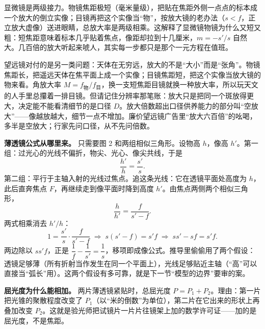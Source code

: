 \begin{mainline}
显微镜是两级接力。物镜焦距极短（毫米量级），把贴在焦距外侧一点点的标本成一个放大的倒立实像；目镜再把这个实像当“物”，按放大镜的老办法（$s<f$，正立放大虚像）送进眼睛，总放大率是两级相乘。这解释了显微镜物镜为什么又短又粗：短焦距意味着标本几乎贴着焦点，像距却拉到十几厘米，$m=-s'/s$ 自然大。几百倍的放大听起来唬人，其实每一步都只是那个一元方程在值班。

望远镜对付的是另一类问题：天体在无穷远，放大的不是“大小”而是“张角”。物镜焦距长，把遥远天体在焦平面上成一个实像；目镜焦距短，把这个实像当放大镜的物来看。角放大率 $M=f_{\text{物}}/f_{\text{目}}$，换一支短焦距目镜就换一种放大率，所以玩天文的人手里总攥着一排目镜。但请记住分辨率那笔账：放大只是把同一个斑放得更大，决定能不能看清细节的是口径 $D$。放大倍数超出口径供养能力的部分叫“空放大”——像越放越大，细节一点不增加。廉价望远镜广告里“放大六百倍”的吆喝，多半是空放大；行家先问口径，从不先问倍数。

\end{mainline}

\begin{mathbridge}
\textbf{薄透镜公式从哪里来。} 只需要图 2 和两组相似三角形。设物高 $h$，像高 $h'$。第一组：过光心的光线不偏折，物尖、光心、像尖共线，于是
\[
\frac{h'}{h}=\frac{s'}{s}.
\]
第二组：平行于主轴入射的光线过焦点。追这条光线：它在透镜平面处高度为 $h$，此后直奔焦点 $F$，再继续走到像平面时降到高度 $h'$。由焦点两侧两个相似三角形，
\[
\frac{h}{h'}=\frac{f}{s'-f}.
\]
两式相乘消去 $h'/h$：
\[
1=\frac{s'}{s}\cdot\frac{f}{s'-f}
\;\Longrightarrow\;
s(s'-f)=s'f
\;\Longrightarrow\;
ss'-sf=s'f.
\]
两边除以 $ss'f$，正是 $\dfrac{1}{f}-\dfrac{1}{s'}=\dfrac{1}{s}$，移项即成像公式。推导里偷偷用了两个假设：透镜足够薄（所有折射当作发生在同一个平面上），光线足够贴近主轴（“高”可以直接当“弧长”用）。这两个假设有多可靠，就是下一节“模型的边界”要审的案。

\textbf{屈光度为什么能相加。} 两片薄透镜紧贴时，总屈光度 $P=P_1+P_2$。理由：第一片把光锥的聚散程度改变了 $P_1$（以“米的倒数”为单位），第二片在它出来的形状上再叠加改变 $P_2$。这就是验光师把试镜片一片片往镜架上加的数学许可证——加的是屈光度，不是焦距。
\end{mathbridge}

